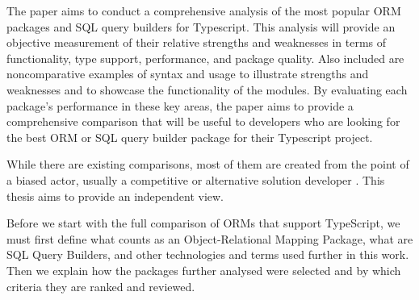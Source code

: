 The paper aims to conduct a comprehensive analysis of the most popular ORM
packages and SQL query builders for Typescript. This analysis will provide an
objective measurement of their relative strengths and weaknesses in terms of
functionality, type support, performance, and package quality. Also included are
noncomparative examples of syntax and usage to illustrate strengths and
weaknesses and to showcase the functionality of the modules. By evaluating each
package's performance in these key areas, the paper aims to provide a
comprehensive comparison that will be useful to developers who are looking for
the best ORM or SQL query builder package for their Typescript project.

While there are existing comparisons, most of them are created from the point of
a biased actor, usually a competitive or alternative solution developer
\cite{drizzleComparison} \cite{imdbBench}. This thesis aims to provide an
independent view.

Before we start with the full comparison of ORMs that support TypeScript, we
must first define what counts as an Object-Relational Mapping Package, what are
SQL Query Builders, and other technologies and terms used further in this work.
Then we explain how the packages further analysed were selected and by which
criteria they are ranked and reviewed.

